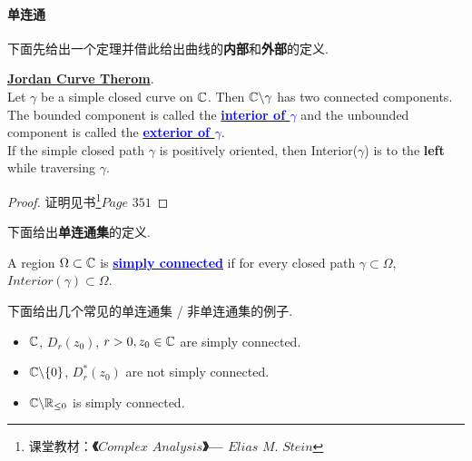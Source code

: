 \paragraph{单连通}
下面先给出一个定理并借此给出曲线的\textbf{内部}和\textbf{外部}的定义.
\begin{thm}\label{thm 4.3.1}
	\underline{\textbf{Jordan Curve Therom}}.\\
	Let $\gamma$ be a simple closed curve on $\mathbb{C}$. Then $\mathbb{C} \backslash \gamma$ has two connected components. The bounded component is called the \underline{\textcolor{blue}{\textbf{interior of $\gamma$}}} and the unbounded component is called the \underline{\textcolor{blue}{\textbf{exterior of $\gamma$}}}.\\
	
	If the simple closed path $\gamma$ is positively oriented, then Interior($\gamma$) is to the \textbf{left} while traversing $\gamma$.
	
	\vspace{2em}
	\begin{proof}
		证明见书\footnote{课堂教材：\textbf{《$Complex \,\, Analysis$》---  $Elias \,\, M. \,\, Stein$}}$Page \,\, 351$
	\end{proof}
\end{thm}

\vspace{2em}
下面给出\textbf{单连通集}的定义.
\begin{defn}\label{def 4.3.1}
	A region $\Omega \subset \mathbb{C}$ is \underline{\textcolor{blue}{\textbf{simply connected}}} if for every closed path $\gamma \subset \Omega$, $Interior(\gamma) \subset \Omega$.
\end{defn}

\vspace{2em}
\begin{example}\label{ex 4.3.1}
	下面给出几个常见的单连通集 / 非单连通集的例子.
	\begin{itemize}
		\item $\mathbb{C}$, $D_{r}(z_0)$, $r > 0 , z_0 \in \mathbb{C}$ are simply connected.
		
		\item $\mathbb{C} \backslash \{ 0 \}$, $D_{r}^{*}(z_0)$ are not simply connected.
		
		\item $\mathbb{C} \backslash \mathbb{R}_{\leq 0}$ is simply connected.
	\end{itemize}
\end{example}

\newpage
